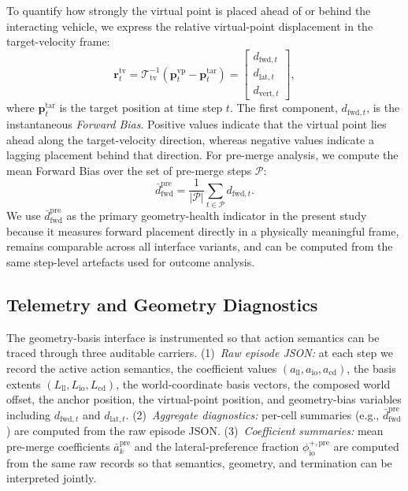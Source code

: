 \documentclass[drones,article,submit,pdftex,moreauthors]{Definitions/mdpi}
\begin{document}
To quantify how strongly the virtual point is placed ahead of or behind the interacting vehicle, we express the relative virtual-point displacement in the target-velocity frame:
\begin{equation}
\mathbf{r}^{\mathrm{tv}}_t
=
\mathcal{T}_{\mathrm{tv}}^{-1}
\left(
\mathbf{p}^{\mathrm{vp}}_t - \mathbf{p}^{\mathrm{tar}}_t
\right)
=
\begin{bmatrix}
d_{\mathrm{fwd},t} \\
d_{\mathrm{lat},t} \\
d_{\mathrm{vert},t}
\end{bmatrix},
\label{eq:forward_bias_vector}
\end{equation}
where $\mathbf{p}^{\mathrm{tar}}_t$ is the target position at time step $t$. The first component, $d_{\mathrm{fwd},t}$, is the instantaneous \emph{Forward Bias}. Positive values indicate that the virtual point lies ahead along the target-velocity direction, whereas negative values indicate a lagging placement behind that direction. For pre-merge analysis, we compute the mean Forward Bias over the set of pre-merge steps $\mathcal{P}$:
\begin{equation}
\bar{d}_{\mathrm{fwd}}^{\mathrm{pre}}
=
\frac{1}{|\mathcal{P}|}
\sum_{t \in \mathcal{P}} d_{\mathrm{fwd},t}.
\label{eq:premerge_forward_bias}
\end{equation}
We use $\bar{d}_{\mathrm{fwd}}^{\mathrm{pre}}$ as the primary geometry-health indicator in the present study because it measures forward placement directly in a physically meaningful frame, remains comparable across all interface variants, and can be computed from the same step-level artefacts used for outcome analysis.

\subsection{Telemetry and Geometry Diagnostics}

The geometry-basis interface is instrumented so that action semantics can be traced through three auditable carriers. (1)\ \emph{Raw episode JSON:} at each step we record the active action semantics, the coefficient values $(a_{\mathrm{ll}}, a_{\mathrm{io}}, a_{\mathrm{cd}})$, the basis extents $(L_{\mathrm{ll}}, L_{\mathrm{io}}, L_{\mathrm{cd}})$, the world-coordinate basis vectors, the composed world offset, the anchor position, the virtual-point position, and geometry-bias variables including $d_{\mathrm{fwd},t}$ and $d_{\mathrm{lat},t}$. (2)\ \emph{Aggregate diagnostics:} per-cell summaries (e.g., $\bar{d}_{\mathrm{fwd}}^{\mathrm{pre}}$) are computed from the raw episode JSON. (3)\ \emph{Coefficient summaries:} mean pre-merge coefficients $\bar{a}_{k}^{\mathrm{pre}}$ and the lateral-preference fraction $\phi_{\mathrm{io}}^{+,\mathrm{pre}}$ are computed from the same raw records so that semantics, geometry, and termination can be interpreted jointly.
\end{document}

